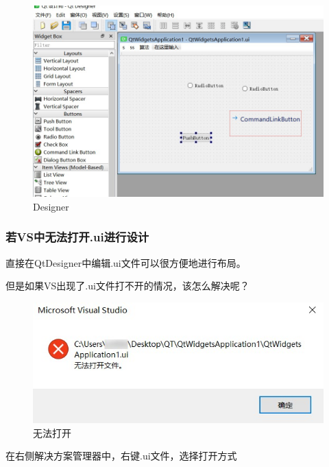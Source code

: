 \documentclass[cs4size,a4paper]{ctexart}
\numberwithin{equation}{section}
\numberwithin{table}{section}
\numberwithin{figure}{section}
\begin{document}
\begin{figure}[H]
\small
\centering
\includegraphics[width=\textwidth]{Designer.jpg}
\caption{Designer} \label{fig:Designer}
\end{figure}

\subsubsection{若VS中无法打开.ui进行设计}

直接在QtDesigner中编辑.ui文件可以很方便地进行布局。

但是如果VS出现了.ui文件打不开的情况，该怎么解决呢？

\begin{figure}[H]
\small
\centering
\includegraphics{无法打开.jpg}
\caption{无法打开} \label{fig:无法打开}
\end{figure}

在右侧解决方案管理器中，右键.ui文件，选择\colorbox{LetMeFlyGray}{打开方式}
\end{document}
